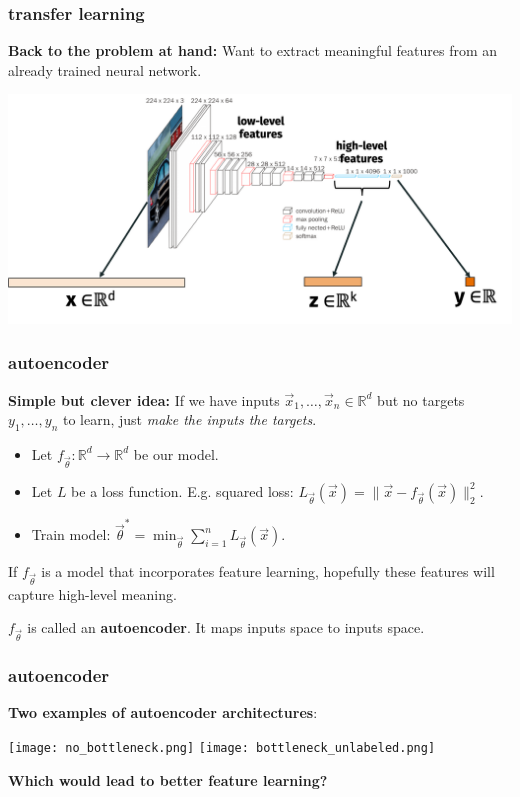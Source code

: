 \documentclass[handout,compress]{beamer}
\newcommand{\R}{\mathbb{R}}
\begin{document}
\begin{frame}
	\frametitle{transfer learning}
	\textbf{Back to the problem at hand:} Want to extract meaningful features from an already trained neural network.
	\begin{center}
		\includegraphics[width=\textwidth]{transfer_abstract.png}
	\end{center}
\end{frame}


\begin{frame}
	\frametitle{autoencoder}
	\textbf{Simple but clever idea:} If we have inputs $\vec{x}_1,\ldots, \vec{x}_n \in \R^d$ but no targets $y_1, \ldots, y_n$ to learn, just \emph{make the inputs the targets}. 
	\begin{itemize}
		\item Let $f_{\vec{\theta}}: \R^d \rightarrow \R^d$ be our model.
		\item Let $L$ be a loss function. E.g. squared loss: $L_{\vec{\theta}}(\vec{x}) = \|\vec{x} - f_{\vec{\theta}}(\vec{x})\|_2^2$. 
		\item Train model: $\vec{\theta}^* = \min_{\vec{\theta}} \sum_{i=1}^n L_{\vec{\theta}}(\vec{x})$. 
	\end{itemize}
If $f_{\vec{\theta}}$ is a model that incorporates feature learning, hopefully these features will capture high-level meaning.

\begin{center}
	$f_{\vec{\theta}}$ is called an \textbf{\alert{autoencoder}}. It maps inputs space to inputs space.
\end{center}
\end{frame}

\begin{frame}
	\frametitle{autoencoder}
	\textbf{Two examples of autoencoder architectures}:
	\begin{center}
		\texttt{[image: no\_bottleneck.png]} \texttt{[image: bottleneck\_unlabeled.png]}
		
		\textbf{\alert{Which would lead to better feature learning?}}
	\end{center}
\end{frame}
\end{document}
